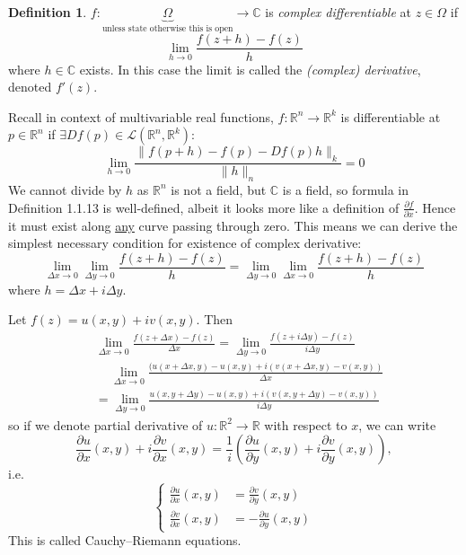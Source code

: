 \documentclass[a4paper]{article}
\theoremstyle{definition}
\newtheorem{defn}{Definition}[subsection]
\begin{document}
\begin{defn}
$f:\underbrace{\Omega}_{\text{unless state otherwise this is open}} \rightarrow \mathbb C$ is \textit{complex differentiable} at $z\in \Omega$ if
\[
\lim_{h\rightarrow 0} \frac{f(z+h)-f(z)}{h}
\]
where $h\in \mathbb C$ exists. In this case the limit is called the \textit{(complex) derivative}, denoted $f'(z)$.
\end{defn}

Recall in context of multivariable real functions, $f:\mathbb R^n \rightarrow \mathbb R^k$ is differentiable at $p\in \mathbb R^n$ if $\exists Df(p) \in \mathcal L(\mathbb R^n,\mathbb R^k) :$
\[
\lim_{h\rightarrow 0} \frac{\|f(p+h)-f(p)-Df(p)h\|_k}{\|h\|_n} =0
\]
We cannot divide by $h$ as $\mathbb R^n$ is not a field, but $\mathbb C$ is a field, so formula in Definition 1.1.13 is well-defined, albeit it looks more like a definition of $\frac{\partial f}{\partial x}$. Hence it must exist along \underline{any} curve passing through zero. This means we can derive the simplest necessary condition for existence of complex derivative:
\[
\lim_{\Delta x\rightarrow 0} \lim_{\Delta y\rightarrow 0} \frac{f(z+h)-f(z)}{h}=\lim_{\Delta y\rightarrow 0} \lim_{\Delta x\rightarrow 0} \frac{f(z+h)-f(z)}{h}
\]
where $h=\Delta x+i\Delta y$.

Let $f(z)=u(x,y)+iv(x,y).$ Then
\[
\begin{aligned}
& \lim_{\Delta x\rightarrow 0} \frac{f(z+\Delta x) -f(z)}{\Delta x} = \lim_{\Delta y \rightarrow 0} \frac{f(z+i\Delta y)-f(z)}{i\Delta y} \\
&\quad \ \lim_{\Delta x\rightarrow 0} \frac{(u(x+\Delta x, y) - u(x,y) + i(v(x+\Delta x,y)-v(x,y))}{\Delta x}  \\ &= \lim_{\Delta y\rightarrow 0} \frac{u(x,y+\Delta y)-u(x,y) + i (v(x,y+\Delta y) - v(x,y))}{i\Delta y} 
\end{aligned}
\]
so if we denote partial derivative of $u:\mathbb R^2 \rightarrow \mathbb R$ with respect to $x$, we can write
\[
\frac{\partial u}{\partial x} (x,y) + i \frac{\partial v}{\partial x} (x,y) = \frac{1}{i} \left( \frac{\partial u}{\partial y} (x,y) + i \frac{\partial v}{\partial y}(x,y) \right),
\]
i.e.
\[
\left\{\begin{aligned}
\frac{\partial u}{\partial x}(x,y) &= \frac{\partial v}{\partial y} (x,y) \\
\frac{\partial v}{\partial x}(x,y) &= -\frac{\partial u}{\partial y} (x,y)
\end{aligned} \right.
\]
This is called Cauchy–Riemann equations.
\end{document}
